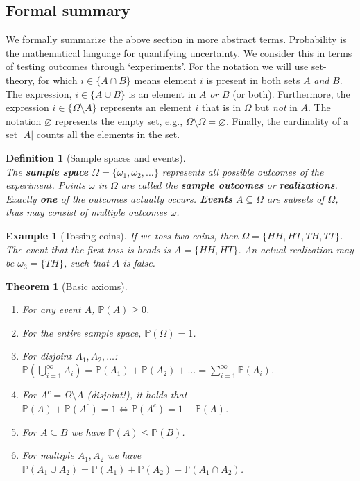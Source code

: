 \documentclass{article}
\newtheorem{definition}{Definition}
\newtheorem{theorem}{Theorem}
\newtheorem{example}{Example}
\begin{document}
\subsection{Formal summary}
We formally summarize the above section in more abstract terms. Probability is the mathematical language for quantifying uncertainty. We consider this in terms of testing outcomes through `experiments'. For the notation we will use set-theory, for which $i\in\{A\cap B\}$ means element $i$ is present in both sets $A$ \textit{and} $B$. The expression, $i\in\{A\cup B\}$ is an element in $A$ \textit{or} $B$ (or both). Furthermore, the expression $i\in\{\Omega\setminus A\}$ represents an element $i$ that is in $\Omega$ but \textit{not} in $A$. The notation $\varnothing$ represents the empty set, e.g., $\Omega\setminus\Omega=\varnothing$. Finally, the cardinality of a set $|A|$ counts all the elements in the set.
\begin{definition}[Sample spaces and events]\ \\
    The \textbf{sample space} $\Omega=\{\omega_1,\omega_2,\dots\}$ represents all possible outcomes of the experiment. Points $\omega$ in $\Omega$ are called the \textbf{sample outcomes} or \textbf{realizations}. Exactly \textbf{one} of the outcomes actually occurs. \textbf{Events} $A\subseteq\Omega$ are subsets of $\Omega$, thus may consist of multiple outcomes $\omega$.
\end{definition}
\begin{example}[Tossing coins]
    If we toss two coins, then $\Omega=\{HH,HT,TH,TT\}$. The event that the first toss is heads is $A=\{HH,HT\}$. An actual realization may be $\omega_3=\{TH\}$, such that $A$ is false.
\end{example}
\begin{theorem}[Basic axioms]
    \ 
    \begin{enumerate}\itemsep0em
        \item For any event $A$, $\mathbb{P}(A)\geq 0$.
        \item For the entire sample space, $\mathbb{P}(\Omega)=1$.
        \item For disjoint $A_1,A_2,\dots$: $\mathbb{P}(\bigcup_{i=1}^\infty A_i)=\mathbb{P}(A_1)+\mathbb{P}(A_2)+\dots=\sum_{i=1}^\infty \mathbb{P}(A_i)$.
        \item[$\Rightarrow$] For $A^c=\Omega\setminus A$ (disjoint!), it holds that $\mathbb{P}(A)+\mathbb{P}(A^c)=1 \Longleftrightarrow\mathbb{P}(A^c)=1-\mathbb{P}(A)$.
        \item[$\Rightarrow$] For $A\subseteq B$ we have $\mathbb{P}(A)\leq \mathbb{P}(B)$.
        \item[$\Rightarrow$] For multiple $A_1,A_2$ we have $\mathbb{P}(A_1 \cup A_2)=\mathbb{P}(A_1)+\mathbb{P}(A_2)-\mathbb{P}(A_1\cap A_2)$.
    \end{enumerate}
\end{theorem}
\end{document}
